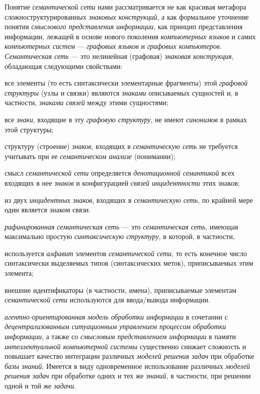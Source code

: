 Понятие \textit{семантической сети} нами рассматривается не как красивая метафора сложноструктурированных \textit{знаковых конструкций}, а как формальное уточнение понятия \textit{смыслового представления информации}, как принцип представления информации, лежащей в основе нового поколения \textit{компьютерных языков} и самих \textit{компьютерных систем} --- \textit{графовых языков} и \textit{графовых компьютеров}. \textit{Семантическая сеть} --- это нелинейная (графовая) \textit{знаковая конструкция}, обладающая следующими свойствами:

\begin{textitemize}
	\item все элементы (то есть синтаксически элементарные фрагменты) этой \textit{графовой структуры} (узлы и связки) являются \textit{знаками} описываемых сущностей и, в частности, \textit{знаками связей} между этими сущностями;
	\item все \textit{знаки}, входящие в эту \textit{графовую структуру}, не имеют \textit{синонимов} в рамках этой структуры;
	\item {} структуру (строение) \textit{знаков}, входящих в \textit{семантическую сеть} не требуется учитывать при ее \textit{семантическом анализе} (понимании);
	\item смысл \textit{семантической сети} определяется \textit{денотационной семантикой} всех входящих в нее \textit{знаков} и конфигурацией \textit{связей инцидентности} этих знаков;
	\item из двух \textit{инцидентных знаков}, входящих в \textit{семантическую сеть}, по крайней мере один является знаком связи.
\end{textitemize}

\textit{рафинированная семантическая сеть} --- это \textit{семантическая сеть}, имеющая максимально простую \textit{синтаксическую структуру}, в которой, в частности,

\begin{textitemize}
	\item используется  \textit{алфавит} элементов \textit{семантической сети}, то есть конечное число синтаксически выделяемых типов (синтаксических меток), приписываемых этим элемента;
	\item внешние идентификаторы (в частности, имена), приписываемые элементам \textit{семантической сети} используются  для ввода/вывода информации.
\end{textitemize}

\textit{агентно-ориентированная модель обработки информации} в сочетании с \textit{децентрализованным ситуационным управлением процессом обработки информации}, а также со \textit{смысловым представлением информации} в памяти \textit{интеллектуальной компьютерной системы} существенно снижает сложность и повышает качество интеграции различных \textit{моделей решения задач} при обработке  \textit{базы знаний}. Имеется в виду одновременное использование различных \textit{моделей решения задач} при обработке одних и тех же \textit{знаний}, в частности, при решении одной и той же \textit{задачи}.

